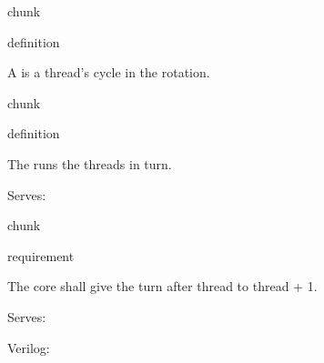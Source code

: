 \documentclass[letterpaper,10pt,english]{sphinxmanual}
\begin{document}
\begin{sphinxuseclass}{chunk}
\begin{sphinxuseclass}{definition}\label{\detokenize{core/core:core.turn}}
\sphinxAtStartPar
{} 

\sphinxAtStartPar
A  is a thread’s cycle in the rotation.

\end{sphinxuseclass}
\end{sphinxuseclass}
\begin{sphinxuseclass}{chunk}
\begin{sphinxuseclass}{definition}\label{\detokenize{core/core:core.core}}
\sphinxAtStartPar
{} 

\sphinxAtStartPar
The  runs the threads in turn.

\sphinxAtStartPar
Serves: {\hyperref[\detokenize{design/design:design.timing}]{}}

\end{sphinxuseclass}
\end{sphinxuseclass}
\begin{sphinxuseclass}{chunk}
\begin{sphinxuseclass}{requirement}\label{\detokenize{core/core:core.rotation}}
\sphinxAtStartPar
{} 

\sphinxAtStartPar
The core shall give the turn after
thread  to thread  + 1.

\begingroup{}\def\sphinxbelowcaptionspace{0pt}
\begin{sphinxVerbatim}[commandchars=\\\{\}]
          
\end{sphinxVerbatim}

\endgroup

\sphinxAtStartPar
Serves: {\hyperref[\detokenize{design/design:design.timing}]{}}

\end{sphinxuseclass}
\end{sphinxuseclass}
\sphinxAtStartPar
Verilog: {\hyperref[\detokenize{core/core:source-1}]{}}
\end{document}
